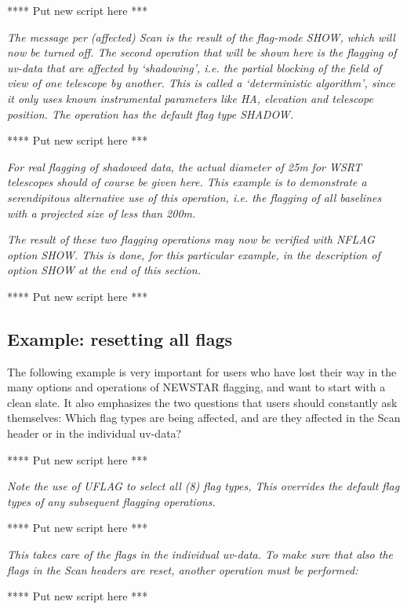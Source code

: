 **** Put new script here ***


{\it The message per (affected) Scan is the result of the flag-mode SHOW,
which will now be turned off. The second operation that will be
shown here is the flagging of uv-data that are affected by `shadowing',
i.e. the partial blocking of the field of view of one telescope by another.
This is called a `deterministic algorithm', since it only uses known
instrumental parameters like HA, elevation and telescope position.
The operation has the default flag type SHADOW.}


**** Put new script here ***


{\it For real flagging of shadowed data, the actual diameter of 25m for WSRT
telescopes should of course be given here. This example is to demonstrate
a serendipitous alternative use of this operation, i.e. the flagging of
all baselines with a {\em projected} size of less than 200m.}


{\it  The result of these two flagging operations may now be verified
with NFLAG option SHOW. This is done, for this particular example, in
the description of option SHOW at the end of this section.}


**** Put new script here ***


\newpage
\subsection{Example: resetting all flags}
\label{.reset}

The following example is very important for users who have lost their way
in the many options and operations of NEWSTAR flagging, and want to start
with a clean slate. It also emphasizes the two questions that users should
constantly ask themselves: Which flag types are being affected, and are they
affected in the Scan header or in the individual uv-data?


**** Put new script here ***


{\it Note the use of UFLAG to select all (8) flag types, This overrides the
default flag types of any subsequent flagging operations.}


**** Put new script here ***


{\it This takes care of the flags in the individual uv-data. To make sure
that also the flags in the Scan headers are reset, another operation must
be performed:}


**** Put new script here ***


